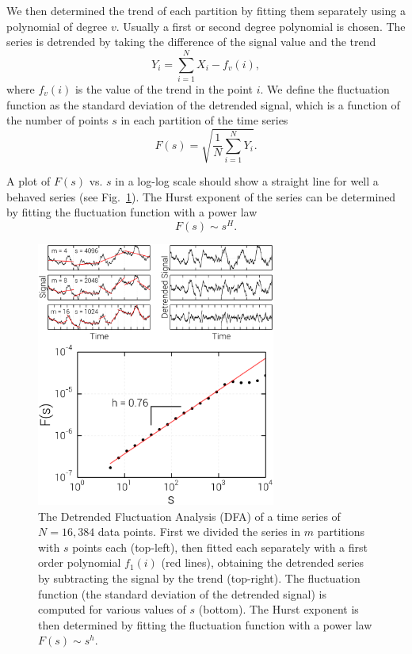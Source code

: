 We then determined the trend of each partition by fitting them separately using
a polynomial of degree $v$. Usually a first or second degree polynomial is
chosen. The series is detrended by taking the difference of the signal value and
the trend 
\begin{equation}
    Y_i = \sum_{i=1}^{N} X_i - f_v(i),
\end{equation}
where $f_v(i)$ is the value of the trend in the point $i$. We define the fluctuation
function as the standard deviation of the detrended signal, which is a function
of the number of points $s$ in each partition of the time series
\begin{equation}
    F(s) = \sqrt{\frac{1}{N}\sum_{i=1}^{N}Y_i}.
\end{equation}

A plot of $F(s)$ vs. $s$ in a log-log scale should show a straight line for
well a behaved series (see Fig.~\ref{fig:dfa}). The Hurst exponent of the
series can be determined by fitting the fluctuation function with a power law
\begin{equation}
    F(s)\sim s^H.
\end{equation}

\begin{figure}[t]
    \begin{center}
        \includegraphics[width=0.7\textwidth]{chapters/ch6-asle/figs/dfa}
    \end{center}
    \caption{The Detrended Fluctuation Analysis (DFA) of a time series of
        $N=16,384$ data points. First we divided the series in $m$ partitions with
        $s$ points each (top-left), then fitted each separately with a first order
        polynomial $f_1(i)$ (red lines), obtaining the detrended series by subtracting
        the signal by the trend (top-right).  The fluctuation function (the standard
        deviation of the detrended signal) is computed for various values of $s$
        (bottom).  The Hurst exponent is then determined by fitting the fluctuation
        function with a power law $F(s)\sim s^h$.}
\label{fig:dfa}
\end{figure}


